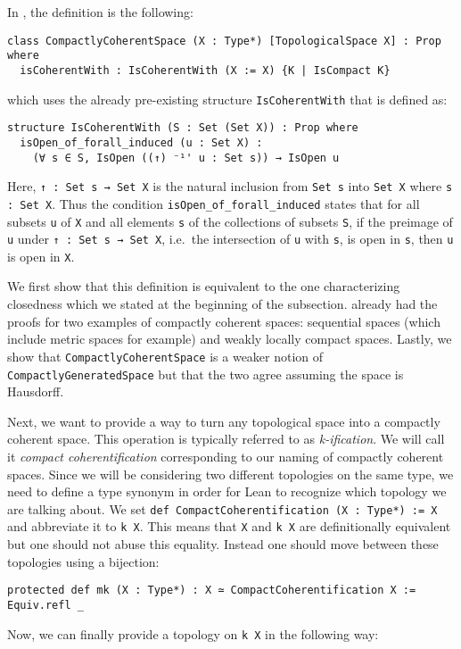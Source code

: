 In \mathlib, the definition is the following: 

\begin{lstlisting}[frame=single]
class CompactlyCoherentSpace (X : Type*) [TopologicalSpace X] : Prop where
  isCoherentWith : IsCoherentWith (X := X) {K | IsCompact K}
\end{lstlisting}

which uses the already pre-existing structure \lstinline|IsCoherentWith| that is defined as: 

\begin{lstlisting}[frame=single]
structure IsCoherentWith (S : Set (Set X)) : Prop where
  isOpen_of_forall_induced (u : Set X) : 
    (∀ s ∈ S, IsOpen ((↑) ⁻¹' u : Set s)) → IsOpen u
\end{lstlisting}

Here, \lstinline|↑ : Set s → Set X| is the natural inclusion from \lstinline|Set s| into \lstinline|Set X| where \lstinline|s : Set X|. 
Thus the condition \lstinline|isOpen_of_forall_induced| states that for all subsets \lstinline|u| of \lstinline|X| and all elements \lstinline|s| of the collections of subsets \lstinline|S|, if the preimage of \lstinline|u| under \lstinline|↑ : Set s → Set X|, i.e.\ the intersection of \lstinline|u| with \lstinline|s|, is open in \lstinline|s|, then \lstinline|u| is open in \lstinline|X|.

We first show that this definition is equivalent to the one characterizing closedness which we stated at the beginning of the subsection. 
\mathlib already had the proofs for two examples of compactly coherent spaces: sequential spaces (which include metric spaces for example) and weakly locally compact spaces. 
Lastly, we show that \lstinline|CompactlyCoherentSpace| is a weaker notion of \lstinline|CompactlyGeneratedSpace| but that the two agree assuming the space is Hausdorff.

Next, we want to provide a way to turn any topological space into a compactly coherent space. 
This operation is typically referred to as \emph{k-ification}. 
We will call it \emph{compact coherentification} corresponding to our naming of compactly coherent spaces. 
Since we will be considering two different topologies on the same type, we need to define a type synonym in order for Lean to recognize which topology we are talking about. 
We set \lstinline|def CompactCoherentification (X : Type*) := X| and abbreviate it to \lstinline|k X|. 
This means that \lstinline|X| and \lstinline|k X| are definitionally equivalent but one should not abuse this equality. 
Instead one should move between these topologies using a bijection: 
\begin{lstlisting}[frame=single]
protected def mk (X : Type*) : X ≃ CompactCoherentification X := Equiv.refl _
\end{lstlisting}
Now, we can finally provide a topology on \lstinline|k X| in the following way: 

